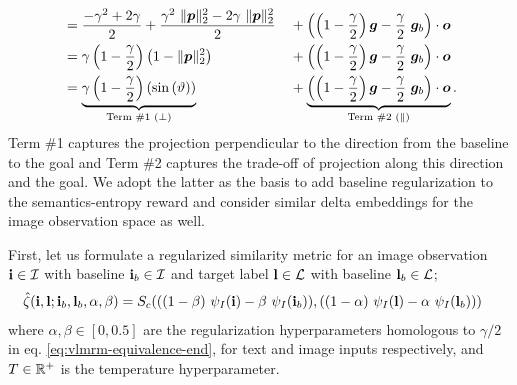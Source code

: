 \begin{align}
    &= \dfrac{-\gamma^2 + 2\gamma}{2} + \dfrac{\gamma^2\ \norm{\bmp}^2_2 - 2 \gamma\ \norm{\bmp}^2_2}{2} &&+ \left(\left(1 - \dfrac{\gamma}{2}\right) \bmg - \dfrac{\gamma}{2}\ \bmg_b\right) \cdot \bmo\\ %
    &= \gamma\left(1 - \dfrac{\gamma}{2}\right)\left(1 -\norm{\bmp}^2_2\right) &&+ \left(\left(1 - \dfrac{\gamma}{2}\right) \bmg - \dfrac{\gamma}{2}\ \bmg_b\right) \cdot \bmo\\
    &= \underbrace{\gamma\left(1 - \dfrac{\gamma}{2}\right)\left(\sin\left(\vartheta\right)\right)}_{\text{Term \#1 (\(\perp\))}} &&+ \underbrace{\left(\left(1 - \dfrac{\gamma}{2}\right) \bmg - \dfrac{\gamma}{2}\ \bmg_b\right) \cdot \bmo}_{\text{Term \#2 (\(\parallel\))}}.
    \label{eq:vlmrm-equivalence-end}
\end{align}
Term \#1 captures the projection perpendicular to the direction from the baseline to the goal and Term \#2 captures the trade-off of projection along this direction and the goal. We adopt the latter as the basis to add baseline regularization to the semantics-entropy reward and consider similar delta embeddings for the image observation space as well.

First, let us formulate a regularized similarity metric for an image observation \(\mathbf{i} \in \mathcal{I}\) with baseline \(\mathbf{i}_b \in \mathcal{I}\) and target label \(\mathbf{l} \in \mathcal{L}\) with baseline \(\mathbf{l}_b \in \mathcal{L}\);
\begin{equation}
    \label{eq:clip-similarity-reg}
    \begin{split}
        \hat{\zeta}(\mathbf{i}, \mathbf{l}; \mathbf{i}_b, \mathbf{l}_b, \alpha, \beta)
        &= S_c(
            ((1 - \beta)\ \psi_I(\mathbf{i}) - \beta\ \psi_I(\mathbf{i}_b)),
            ((1 - \alpha)\ \psi_I(\mathbf{l}) - \alpha\ \psi_I(\mathbf{l}_b))
        )
    \end{split}
\end{equation}
where \(\alpha, \beta \in [0, 0.5]\) are the regularization hyperparameters homologous to \(\gamma / 2\) in eq. \eqref{eq:vlmrm-equivalence-end}, for text and image inputs respectively, and \(T \in \mathbb{R}^+\) is the temperature hyperparameter.

